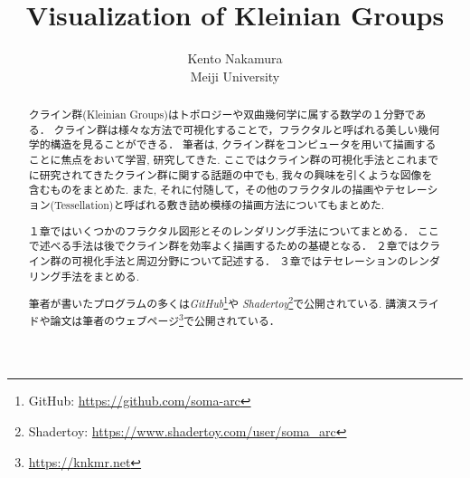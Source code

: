 \documentclass[dvipdfmx]{jsarticle}
\title{ Visualization of Kleinian Groups }
\author{ Kento Nakamura\\
Meiji University\\
}
\date{}
\begin{document}
\maketitle

\begin{abstract}
クライン群(Kleinian Groups)はトポロジーや双曲幾何学に属する数学の１分野である．
クライン群は様々な方法で可視化することで，フラクタルと呼ばれる美しい幾何学的構造を見ることができる．
筆者は, クライン群をコンピュータを用いて描画することに焦点をおいて学習, 研究してきた.
ここではクライン群の可視化手法とこれまでに研究されてきたクライン群に関する話題の中でも, 我々の興味を引くような図像を含むものをまとめた.
また, それに付随して，その他のフラクタルの描画やテセレーション(Tessellation)と呼ばれる敷き詰め模様の描画方法についてもまとめた.

１章ではいくつかのフラクタル図形とそのレンダリング手法についてまとめる．
ここで述べる手法は後でクライン群を効率よく描画するための基礎となる．
２章ではクライン群の可視化手法と周辺分野について記述する．
３章ではテセレーションのレンダリング手法をまとめる.

筆者が書いたプログラムの多くは\textit{GitHub}\footnote{GitHub: \url{https://github.com/soma-arc}}や
\textit{Shadertoy}\footnote{Shadertoy: \url{https://www.shadertoy.com/user/soma\_arc}}で公開されている.
講演スライドや論文は筆者のウェブページ\footnote{\url{https://knkmr.net}}で公開されている．

\end{abstract}

\clearpage

\tableofcontents

\clearpage







\printbibliography
\end{document}

